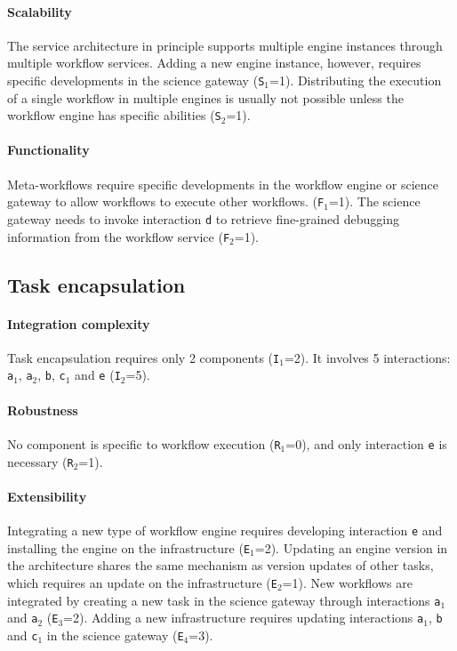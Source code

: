 \documentclass[preprint,3p,twocolumn]{elsarticle}
\newcommand{\correction}[1]{\color{blue}#1\color{black}\xspace}
\begin{document}
\paragraph{Scalability} The service architecture in principle supports
multiple engine instances through multiple workflow services. Adding a
new engine instance, however, requires specific developments in the science gateway
(\texttt{S$_1$}=1). Distributing the execution of a single workflow in multiple
engines is usually not possible unless the workflow engine has
specific abilities (\texttt{S$_2$}=1).

\paragraph{\correction{Functionality}} Meta-workflows require specific
developments in the workflow engine or science gateway to allow
workflows to execute other workflows.  (\texttt{\correction{F}$_1$}=1).
 The
science gateway needs to invoke interaction \texttt{d} to retrieve
fine-grained debugging information from the workflow service
(\texttt{\correction{F}$_2$}=1).

\subsection{Task encapsulation}

\paragraph{Integration complexity} Task encapsulation requires only 2
components (\texttt{I$_1$}=2).  It involves 5 interactions:
\texttt{a$_1$}, \texttt{a$_2$}, \texttt{b}, \correction{\texttt{c$_1$}} and
\texttt{e} (\texttt{I$_2$}=5).

\paragraph{Robustness} No component is specific to workflow execution
(\texttt{R$_1$}=0), and only interaction \texttt{e} is necessary
(\texttt{R$_2$}=1).

\paragraph{Extensibility} Integrating a new type of workflow engine
requires developing interaction \texttt{e} and  installing the engine
on the infrastructure (\texttt{E$_1$}=2). Updating an engine version
in the architecture shares the same mechanism as version updates of
other tasks, which requires an update on the
infrastructure (\texttt{E$_2$}=1).  New workflows are integrated by
creating a new task in the science gateway through interactions
\texttt{a$_1$} and \texttt{a$_2$} (\texttt{E$_3$}=2). Adding a new
infrastructure requires updating interactions \texttt{a$_1$},
\texttt{b} and \correction{\texttt{c$_1$}} in the science gateway (\texttt{E$_4$}=3).
\end{document}
